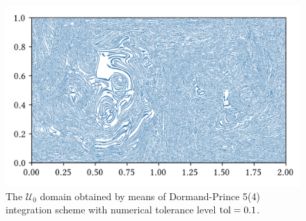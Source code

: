 \begin{figure}[htpb]
    \centering
    \includegraphics{figures/domain_figures/rkdp54_tol=0.1.png}
    \caption[The $\mathcal{U}_{0}$ domain obtained by means of
    Dormand-Prince 5(4) integration scheme with numerical tolerance level
    $\textnormal{tol}=0.1$]{
        The $\mathcal{U}_{0}$ domain obtained by means of Dormand-Prince 5(4)
    integration scheme with numerical tolerance level $\textnormal{tol}=0.1$.}
    \label{fig:u0_dp54}
\end{figure}
